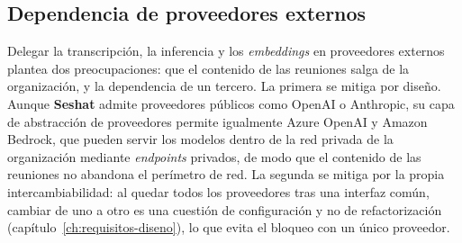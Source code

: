 \subsection{Dependencia de proveedores externos}

Delegar la transcripción, la inferencia y los \textit{embeddings} en proveedores externos plantea
dos preocupaciones: que el contenido de las reuniones salga de la organización, y la dependencia de
un tercero. La primera se mitiga por diseño. Aunque \textbf{Seshat} admite proveedores públicos como
OpenAI o Anthropic, su capa de abstracción de proveedores permite igualmente Azure OpenAI y Amazon
Bedrock, que pueden servir los modelos dentro de la red privada de la organización mediante
\textit{endpoints} privados, de modo que el contenido de las reuniones no abandona el perímetro de
red. La segunda se mitiga por la propia intercambiabilidad: al quedar todos los proveedores tras una
interfaz común, cambiar de uno a otro es una cuestión de configuración y no de refactorización
(capítulo~\ref{ch:requisitos-diseno}), lo que evita el bloqueo con un único proveedor.
